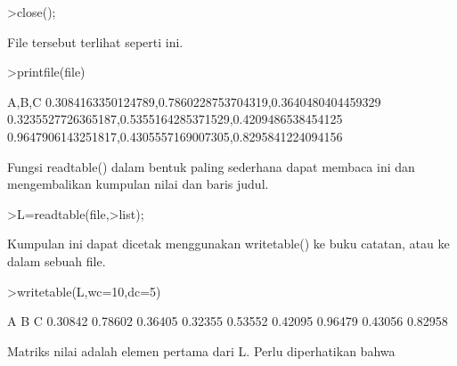 \documentclass[12pt,arial,letterpaper]{book}
\begin{document}
\begin{eulercomment}
\begin{eulercomment}
\begin{eulercomment}
\begin{eulercomment}
\begin{eulercomment}
\begin{eulercomment}
\begin{eulercomment}
\begin{eulercomment}
\begin{eulercomment}
\begin{eulercomment}
\begin{eulercomment}
\begin{eulercomment}
\begin{eulercomment}
\begin{eulercomment}
\begin{eulercomment}
\begin{eulercomment}
\begin{eulercomment}
\begin{eulercomment}
\begin{eulercomment}
\begin{eulercomment}
\begin{eulercomment}
\begin{eulercomment}
\begin{eulercomment}
\begin{eulercomment}
\begin{eulercomment}
\begin{eulercomment}
\begin{eulercomment}
\begin{eulercomment}
\begin{eulercomment}
\begin{eulercomment}
\begin{eulercomment}
\begin{eulercomment}
\begin{eulercomment}
\begin{eulercomment}
\begin{eulercomment}
\begin{eulercomment}
\begin{eulercomment}
\begin{eulercomment}
\begin{eulerprompt}
>close();
\end{eulerprompt}
\begin{eulercomment}
File tersebut terlihat seperti ini.
\end{eulercomment}
\begin{eulerprompt}
>printfile(file)
\end{eulerprompt}
\begin{euleroutput}
  A,B,C
  0.3084163350124789,0.7860228753704319,0.3640480404459329
  0.3235527726365187,0.5355164285371529,0.4209486538454125
  0.9647906143251817,0.4305557169007305,0.8295841224094156
  
\end{euleroutput}
\begin{eulercomment}
Fungsi readtable() dalam bentuk paling sederhana dapat membaca ini dan
mengembalikan kumpulan nilai dan baris judul.
\end{eulercomment}
\begin{eulerprompt}
>L=readtable(file,>list);
\end{eulerprompt}
\begin{eulercomment}
Kumpulan ini dapat dicetak menggunakan writetable() ke buku catatan,
atau ke dalam sebuah file.
\end{eulercomment}
\begin{eulerprompt}
>writetable(L,wc=10,dc=5)
\end{eulerprompt}
\begin{euleroutput}
           A         B         C
     0.30842   0.78602   0.36405
     0.32355   0.53552   0.42095
     0.96479   0.43056   0.82958
\end{euleroutput}
\begin{eulercomment}
Matriks nilai adalah elemen pertama dari L. Perlu diperhatikan bahwa

\end{eulercomment}
\end{eulercomment}
\end{eulercomment}
\end{eulercomment}
\end{eulercomment}
\end{eulercomment}
\end{eulercomment}
\end{eulercomment}
\end{eulercomment}
\end{eulercomment}
\end{eulercomment}
\end{eulercomment}
\end{eulercomment}
\end{eulercomment}
\end{eulercomment}
\end{eulercomment}
\end{eulercomment}
\end{eulercomment}
\end{eulercomment}
\end{eulercomment}
\end{eulercomment}
\end{eulercomment}
\end{eulercomment}
\end{eulercomment}
\end{eulercomment}
\end{eulercomment}
\end{eulercomment}
\end{eulercomment}
\end{eulercomment}
\end{eulercomment}
\end{eulercomment}
\end{eulercomment}
\end{eulercomment}
\end{eulercomment}
\end{eulercomment}
\end{eulercomment}
\end{eulercomment}
\end{eulercomment}
\end{eulercomment}
\end{document}
